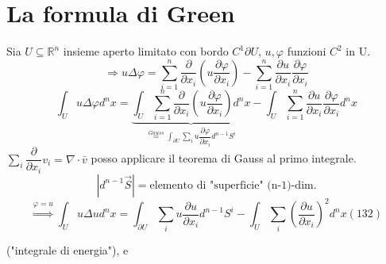 \documentclass[a4paper,11pt]{report}
\newcommand{\Rn}{\mathbb{R}^n}
\begin{document}
\section{La formula di Green}
Sia $U\subseteq \Rn$ insieme aperto limitato con bordo $C^1 \partial U$, $u,\varphi$ funzioni $C^2$ in U.
$$
\Rightarrow u\Delta \varphi = \sum_{i=1}^n\dfrac{\partial}{\partial x_i}\left(u\dfrac{\partial \varphi}{\partial x_i} \right) - \sum_{i=1}^{n}\dfrac{\partial u}{\partial x_i}\dfrac{\partial \varphi}{\partial x_i}
$$
$$
\int_{U}u\Delta \varphi d^nx=\underset{\overset{Gauss}{=}\int_{\partial U}\sum_i u\dfrac{\partial \varphi}{\partial x_i}d^{n-1}S^i}{\underbrace{\int_{U}\sum_{i=1}^n\dfrac{\partial}{\partial x_i}\left(u\dfrac{\partial \varphi}{\partial x_i} \right)d^nx}} - \int_{U} \sum_{i=1}^{n} \dfrac{\partial u}{\partial x_i}\dfrac{\partial \varphi}{\partial x_i}d^nx
$$
$\sum_i \dfrac{\partial }{\partial x_i}v_i = \nabla \cdot \bar{v}$ posso applicare il teorema di Gauss al primo integrale.
$$
\left| d^{n-1}\vec{S}\right| = \text{elemento di "superficie" (n-1)-dim.}
$$
\begin{equation}
\overset{\varphi=u}{\Rightarrow} \int_U u\Delta u d^n x = \int_{\partial U} \sum_i u\dfrac{\partial u}{\partial x_i}d^{n-1}S^i - \int_{U}\sum_i \left(\dfrac{\partial u}{\partial x_i}\right)^2 d^n x (132)
\end{equation}

("integrale di energia"), e 
\end{document}

